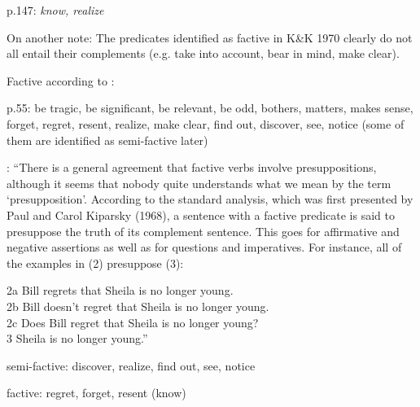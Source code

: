 \documentclass[11pt,fleqn]{article}
\newcommand{\6}{\mbox{$[\hspace*{-.6mm}[$}}
\newcommand{\9}{\mbox{$]\hspace*{-.6mm}]$}}
\begin{document}
p.147: {\em know, realize}

On another note: The predicates identified as factive in K\&K 1970 clearly do not all entail their complements (e.g. take into account, bear in mind, make clear). 

Factive according to \citealt{karttunen71b}:

p.55: be tragic, be significant, be relevant, be odd, bothers, matters, makes sense, forget, regret, resent, realize, make clear, find out, discover, see, notice (some of them are identified as semi-factive later)

\citealt[55]{karttunen71b}: ``There is a general agreement that factive verbs involve presuppositions, although it seems that nobody quite understands what we mean by the term `presupposition'. According to the standard analysis, which was first presented by Paul and Carol Kiparsky (1968), a sentence with a factive predicate is said to presuppose the truth of its complement sentence. This goes for affirmative and negative assertions as well as for questions and imperatives. For instance, all of the examples in (2) presuppose (3):

2a Bill regrets that Sheila is no longer young.
\\
2b Bill doesn't regret that Sheila is no longer young.
\\
2c Does Bill regret that Sheila is no longer young?
\\
3 Sheila is no longer young.''

semi-factive: discover, realize, find out, see, notice

factive: regret, forget, resent (know)
\end{document}

